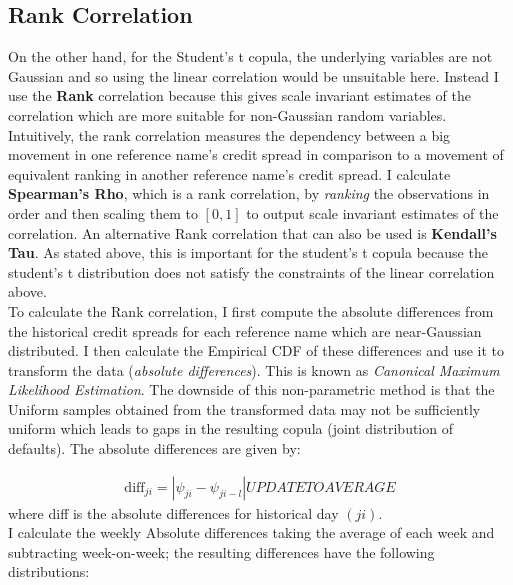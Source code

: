 \documentclass{report}
\theoremstyle{plain}
\theoremstyle{definition}
\begin{document}
\subsection{Rank Correlation}

On the other hand, for the Student's t copula, the underlying variables are not Gaussian and so using the linear correlation would be unsuitable here. Instead I use the \textbf{Rank} correlation because this gives scale invariant estimates of the correlation which are more suitable for non-Gaussian random variables. Intuitively, the rank correlation measures the dependency between a big movement in one reference name's credit spread in comparison to a movement of equivalent ranking in another reference name's credit spread. I calculate \textbf{Spearman's Rho}, which is a rank correlation, by \emph{ranking} the observations in order and then scaling them to $[0,1]$ to output scale invariant estimates of the correlation. An alternative Rank correlation that can also be used is \textbf{Kendall's Tau}. As stated above, this is important for the student's t copula because the student's t distribution does not satisfy the constraints of the linear correlation above. \\

To calculate the Rank correlation, I first compute the absolute differences from the historical credit spreads for each reference name which are near-Gaussian distributed. I then calculate the Empirical CDF of these differences and use it to transform the data (\textit{absolute differences}). This is known as \emph{Canonical Maximum Likelihood Estimation}. The downside of this non-parametric method is that the Uniform samples obtained from the transformed data may not be sufficiently uniform which leads to gaps in the resulting copula (joint distribution of defaults). The absolute differences are given by:

\begin{align*}
\text{diff}_{ji} = |\psi_{ji} - \psi_{ji - l}| UPDATE TO AVERAGE
\end{align*}
where diff is the absolute differences for historical day $(ji)$.\\

I calculate the weekly Absolute differences taking the average of each week and subtracting week-on-week; the resulting differences have the following distributions:
\end{document}
